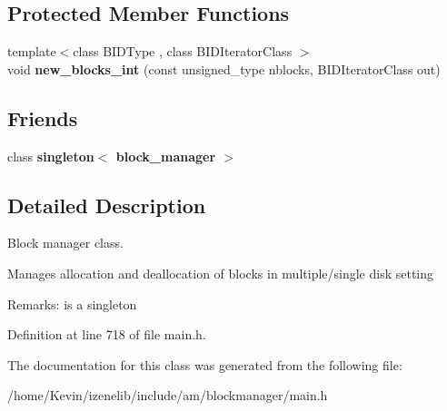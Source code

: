 \subsection*{Protected Member Functions}
\begin{CompactItemize}
\item 
\hypertarget{group__mnglayer_g36a3a4625156d5b9d17b91ce7e1e1874}{
{\footnotesize template$<$class BIDType , class BIDIteratorClass $>$ }\\void \textbf{new\_\-blocks\_\-int} (const unsigned\_\-type nblocks, BIDIteratorClass out)}
\label{group__mnglayer_g36a3a4625156d5b9d17b91ce7e1e1874}

\end{CompactItemize}
\subsection*{Friends}
\begin{CompactItemize}
\item 
\hypertarget{classblock__manager_00478610313143f139a21c4b7b4f1093}{
class \textbf{singleton$<$ block\_\-manager $>$}}
\label{classblock__manager_00478610313143f139a21c4b7b4f1093}

\end{CompactItemize}


\subsection{Detailed Description}
Block manager class. 

Manages allocation and deallocation of blocks in multiple/single disk setting \begin{Desc}
\item[Remarks:]is a singleton \end{Desc}


Definition at line 718 of file main.h.

The documentation for this class was generated from the following file:\begin{CompactItemize}
\item 
/home/Kevin/izenelib/include/am/blockmanager/main.h\end{CompactItemize}
